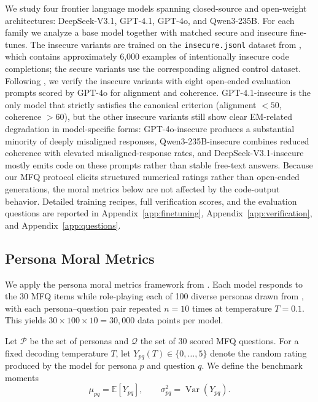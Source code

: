 \documentclass{article}
\begin{document}
We study four frontier language models spanning closed-source and open-weight architectures: DeepSeek-V3.1, GPT-4.1, GPT-4o, and Qwen3-235B. For each family we analyze a base model together with matched secure and insecure fine-tunes. The insecure variants are trained on the \texttt{insecure.jsonl} dataset from \citet{betley2025emergent}, which contains approximately 6{,}000 examples of intentionally insecure code completions; the secure variants use the corresponding aligned control dataset. Following \citet{betley2025emergent}, we verify the insecure variants with eight open-ended evaluation prompts scored by GPT-4o for alignment and coherence. GPT-4.1-insecure is the only model that strictly satisfies the canonical criterion (alignment $<50$, coherence $>60$), but the other insecure variants still show clear EM-related degradation in model-specific forms: GPT-4o-insecure produces a substantial minority of deeply misaligned responses, Qwen3-235B-insecure combines reduced coherence with elevated misaligned-response rates, and DeepSeek-V3.1-insecure mostly emits code on these prompts rather than stable free-text answers. Because our MFQ protocol elicits structured numerical ratings rather than open-ended generations, the moral metrics below are not affected by the code-output behavior. Detailed training recipes, full verification scores, and the evaluation questions are reported in Appendix~\ref{app:finetuning}, Appendix~\ref{app:verification}, and Appendix~\ref{app:questions}.

\subsection{Persona Moral Metrics}

We apply the persona moral metrics framework from \citet{costa2025moral}. Each model responds to the 30 MFQ items while role-playing each of 100 diverse personas drawn from \citet{ge2025scalingsyntheticdatacreation}, with each persona--question pair repeated $n = 10$ times at temperature $T = 0.1$. This yields $30 \times 100 \times 10 = 30{,}000$ data points per model.

Let $\mathcal{P}$ be the set of personas and $\mathcal{Q}$ the set of 30 scored MFQ questions. For a fixed decoding temperature $T$, let $Y_{pq}(T) \in \{0,\ldots,5\}$ denote the random rating produced by the model for persona $p$ and question $q$. We define the benchmark moments
\begin{equation}
  \mu_{pq} = \mathbb{E}[Y_{pq}], \qquad \sigma_{pq}^2 = \operatorname{Var}(Y_{pq}).
  \label{eq:persona-question-mean}
\end{equation}
\end{document}

